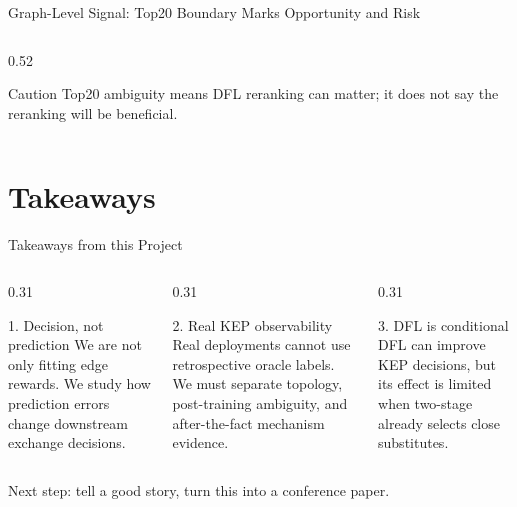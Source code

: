 \documentclass[aspectratio=169,10pt]{beamer}
\begin{document}
\begin{frame}{Graph-Level Signal: Top20 Boundary Marks Opportunity and Risk}
\begin{columns}[T,onlytextwidth]
\begin{column}{0.52\textwidth}
      \vspace{-0.15em}
      \begin{alertblock}{Caution}
        \centering
        \scriptsize
        Top20 ambiguity means DFL reranking can matter; it does not say the reranking will be beneficial.
      \end{alertblock}
    \end{column}
  \end{columns}
\end{frame}

\section{Takeaways}

\begin{frame}{Takeaways from this Project}
  \footnotesize
  \begin{columns}[T,onlytextwidth]
    \begin{column}{0.31\textwidth}
      \begin{block}{1. Decision, not prediction}
        We are not only fitting edge rewards. We study how prediction errors change downstream exchange decisions.
      \end{block}
    \end{column}

    \begin{column}{0.31\textwidth}
      \begin{exampleblock}{2. Real KEP observability}
        Real deployments cannot use retrospective oracle labels. We must separate topology, post-training ambiguity, and after-the-fact mechanism evidence.
      \end{exampleblock}
    \end{column}

    \begin{column}{0.31\textwidth}
      \begin{alertblock}{3. DFL is conditional}
        DFL can improve KEP decisions, but its effect is limited when two-stage already selects close substitutes.
      \end{alertblock}
    \end{column}
  \end{columns}

  \vspace{0.9em}
  \centering

  \vspace{0.6em}
  {\scriptsize Next step: tell a good story, turn this into a conference paper.}
\end{frame}
\end{document}
